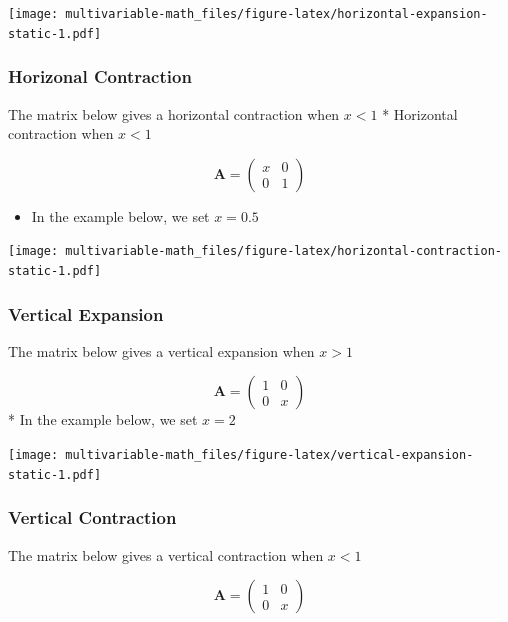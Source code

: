 \documentclass[
]{book}
\providecommand{\tightlist}{%
  \setlength{\itemsep}{0pt}\setlength{\parskip}{0pt}}
\theoremstyle{definition}
\theoremstyle{definition}
\theoremstyle{definition}
\theoremstyle{definition}
\theoremstyle{remark}
\begin{document}
\texttt{[image: multivariable-math\_files/figure-latex/horizontal-expansion-static-1.pdf]}

\hypertarget{horizonal-contraction}{%
\subsubsection{Horizonal Contraction}\label{horizonal-contraction}}

The matrix below gives a horizontal contraction when \(x < 1\)
* Horizontal contraction when \(x < 1\)

\[
\mathbf{A} = \begin{pmatrix}
x & 0 \\
0 & 1
\end{pmatrix}
\]

\begin{itemize}
\tightlist
\item
  In the example below, we set \(x = 0.5\)
\end{itemize}

\texttt{[image: multivariable-math\_files/figure-latex/horizontal-contraction-static-1.pdf]}

\hypertarget{vertical-expansion}{%
\subsubsection{Vertical Expansion}\label{vertical-expansion}}

The matrix below gives a vertical expansion when \(x > 1\)

\[
\mathbf{A} = \begin{pmatrix}
1 & 0 \\
0 & x
\end{pmatrix}
\]
* In the example below, we set \(x = 2\)

\texttt{[image: multivariable-math\_files/figure-latex/vertical-expansion-static-1.pdf]}

\hypertarget{vertical-contraction}{%
\subsubsection{Vertical Contraction}\label{vertical-contraction}}

The matrix below gives a vertical contraction when \(x < 1\)

\[
\mathbf{A} = \begin{pmatrix}
1 & 0 \\
0 & x
\end{pmatrix}
\]
\end{document}
